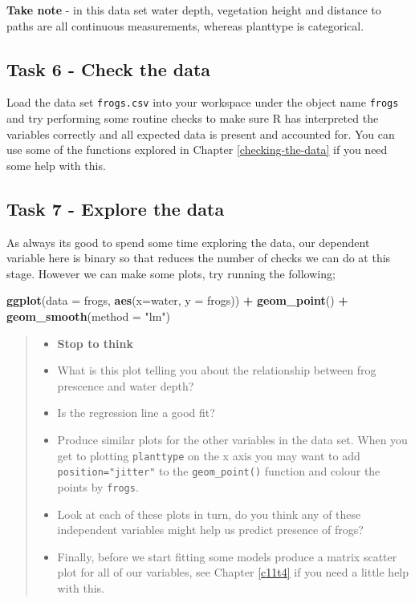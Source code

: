 \documentclass[
]{book}
\newenvironment{Shaded}{\begin{snugshade}}{\end{snugshade}}
\newcommand{\AttributeTok}[1]{\textcolor[rgb]{0.13,0.29,0.53}{#1}}
\newcommand{\FunctionTok}[1]{\textcolor[rgb]{0.13,0.29,0.53}{\textbf{#1}}}
\newcommand{\NormalTok}[1]{#1}
\newcommand{\SpecialCharTok}[1]{\textcolor[rgb]{0.81,0.36,0.00}{\textbf{#1}}}
\newcommand{\StringTok}[1]{\textcolor[rgb]{0.31,0.60,0.02}{#1}}
\providecommand{\tightlist}{%
  \setlength{\itemsep}{0pt}\setlength{\parskip}{0pt}}
\begin{document}
\textbf{Take note} - in this data set water depth, vegetation height and distance to paths are all continuous measurements, whereas planttype is categorical.

\subsection{Task 6 - Check the data}\label{task-6---check-the-data}

Load the data set \texttt{frogs.csv} into your workspace under the object name \texttt{frogs} and try performing some routine checks to make sure R has interpreted the variables correctly and all expected data is present and accounted for. You can use some of the functions explored in Chapter \ref{checking-the-data} if you need some help with this.

\subsection{Task 7 - Explore the data}\label{task-7---explore-the-data}

As always its good to spend some time exploring the data, our dependent variable here is binary so that reduces the number of checks we can do at this stage. However we can make some plots, try running the following;

\begin{Shaded}
\begin{Highlighting}[]
\FunctionTok{ggplot}\NormalTok{(}\AttributeTok{data =}\NormalTok{ frogs, }\FunctionTok{aes}\NormalTok{(}\AttributeTok{x=}\NormalTok{water, }\AttributeTok{y =}\NormalTok{ frogs)) }\SpecialCharTok{+}
  \FunctionTok{geom\_point}\NormalTok{() }\SpecialCharTok{+}
  \FunctionTok{geom\_smooth}\NormalTok{(}\AttributeTok{method =} \StringTok{"lm"}\NormalTok{)}
\end{Highlighting}
\end{Shaded}

\begin{quote}
\begin{itemize}
\tightlist
\item
  \textbf{Stop to think}
\item
  What is this plot telling you about the relationship between frog prescence and water depth?
\item
  Is the regression line a good fit?
\item
  Produce similar plots for the other variables in the data set. When you get to plotting \texttt{planttype} on the x axis you may want to add \texttt{position="jitter"} to the \texttt{geom\_point()} function and colour the points by \texttt{frogs}.
\item
  Look at each of these plots in turn, do you think any of these independent variables might help us predict presence of frogs?
\item
  Finally, before we start fitting some models produce a matrix scatter plot for all of our variables, see Chapter \ref{c11t4} if you need a little help with this.
\end{itemize}
\end{quote}
\end{document}
